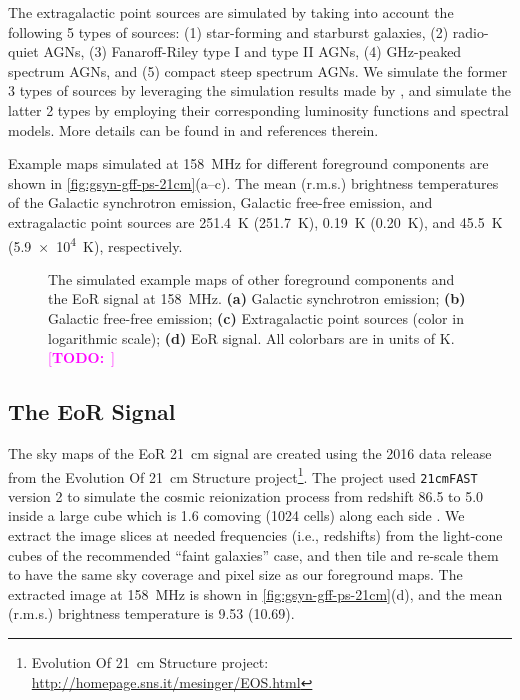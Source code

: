 \documentclass[modern]{aastex62}
\newcommand{\TODO}[1]{\textcolor{magenta}{[\textbf{TODO:}~\uuline{#1}]}}
\begin{document}
The extragalactic point sources are simulated by taking into account the
following 5 types of sources: (1) star-forming and starburst galaxies,
(2) radio-quiet AGNs, (3) Fanaroff-Riley type I and type II AGNs,
(4) GHz-peaked spectrum AGNs, and (5) compact steep spectrum AGNs.
We simulate the former 3 types of sources by leveraging the simulation
results made by \citet{wilman2008}, and simulate the latter 2 types
by employing their corresponding luminosity functions and spectral models.
More details can be found in \citet{wang2010} and references therein.

Example maps simulated at \SI{158}{\MHz} for different foreground
components are shown in \autoref{fig:gsyn-gff-ps-21cm}(a--c).
The mean (r.m.s.) brightness temperatures of the Galactic synchrotron
emission, Galactic free-free emission, and extragalactic point sources
are \SI{251.4}{\kelvin} (\SI{251.7}{\kelvin}),
\SI{0.19}{\kelvin} (\SI{0.20}{\kelvin}),
and \SI{45.5}{\kelvin} (\SI{5.9e4}{\kelvin}), respectively.

\begin{figure}
  \caption{\label{fig:gsyn-gff-ps-21cm}%
    The simulated example maps of other foreground components and
    the EoR signal at \SI{158}{\MHz}.
    \textbf{(a)} Galactic synchrotron emission;
    \textbf{(b)} Galactic free-free emission;
    \textbf{(c)} Extragalactic point sources (color in logarithmic scale);
    \textbf{(d)} EoR signal.
    All colorbars are in units of \si{\kelvin}.
    \TODO{add text labels; zoom in colorbars}
  }
\end{figure}


\subsection{The EoR Signal}
\label{sec:eor-signal}

The sky maps of the EoR 21~cm signal are created using the 2016
data release from the Evolution Of 21~cm Structure project\footnote{%
  Evolution Of 21~cm Structure project:
  \url{http://homepage.sns.it/mesinger/EOS.html}}.
The project used \texttt{21cmFAST} version 2 \citep{mesinger2011} to
simulate the cosmic reionization process from redshift 86.5 to 5.0 inside
a large cube which is 1.6 comoving \si{\Gpc} (1024 cells) along each side
\citep{mesinger2016}.
We extract the image slices at needed frequencies (i.e., redshifts) from
the light-cone cubes of the recommended \enquote{faint galaxies} case,
and then tile and re-scale them to have the same sky coverage and
pixel size as our foreground maps.
The extracted image at \SI{158}{\MHz} is shown in
\autoref{fig:gsyn-gff-ps-21cm}(d),
and the mean (r.m.s.) brightness temperature is
\SI{9.53}{\mK} (\SI{10.69}{\mK}).
\end{document}
